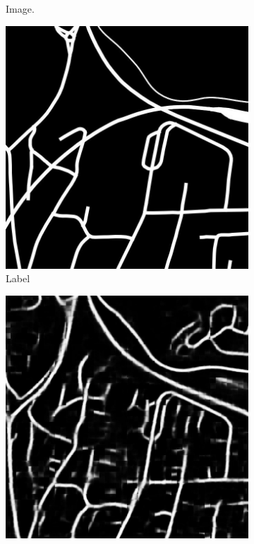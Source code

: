 \begin{figure}[H]
\begin{subfigure}{0.23\textwidth}
\caption{ Image.}
\vspace{0.2cm} %
\end{subfigure}
\hspace*{\fill} %
\begin{subfigure}{0.23\textwidth}
\includegraphics[width=\textwidth]{figs/appendix/label1217.jpg}
\caption{Label}
\vspace{0.2cm} %
\end{subfigure}
\hspace*{\fill} %
\begin{subfigure}{0.23\textwidth}
\includegraphics[width=\textwidth]{figs/appendix/pred1217.jpg}

\end{subfigure}
\end{figure}
